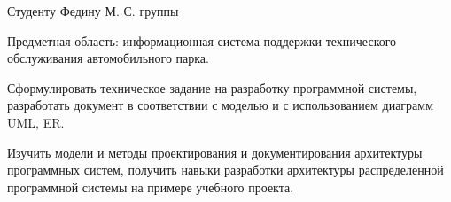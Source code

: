 
Студенту Федину М. С. \hfill группы \makeatletter\@group\makeatother

Предметная область: информационная система поддержки
технического обслуживания автомобильного парка.

Сформулировать техническое задание на разработку программной системы,
разработать документ  в соответствии
с моделью  и с использованием диаграмм UML, ER.

Изучить модели и методы проектирования и документирования архитектуры
программных систем, получить навыки разработки архитектуры распределенной
программной системы на примере учебного проекта.
